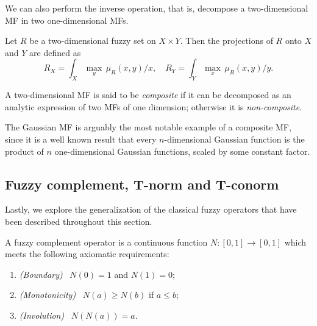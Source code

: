 We can also perform the inverse operation, that is, decompose a two-dimensional MF in two one-dimensional MFs.

\begin{definition}[Projections] Let $R$ be a two-dimensional fuzzy set on $X\times Y$. Then the projections of $R$ onto $X$ and $Y$ are defined as
\[
R_X = \int_X \max_y \, \mu_R(x,y) \slash x, \quad R_Y = \int_Y \max_x \, \mu_R(x,y) \slash y.
\]

\end{definition}

\begin{definition}[Composite MF] A two-dimensional MF is said to be \textit{composite} if it can be decomposed as an analytic expression of two MFs of one dimension; otherwise it is \textit{non-composite}.

\end{definition}

The Gaussian MF is arguably the most notable example of a composite MF, since it is a well known result that every $n$-dimensional Gaussian function is the product of $n$ one-dimensional Gaussian functions, scaled by some constant factor.



\subsection{Fuzzy complement, T-norm and T-conorm} \label{ssec:tnorm}

Lastly, we explore the generalization of the classical fuzzy operators that have been described throughout this section.

\begin{definition} A fuzzy complement operator is a continuous function $N:[0,1] \to [0,1]$ which meets the following axiomatic requirements:

\begin{enumerate}
	\item \textit{(Boundary)} \ $N(0)=1$ and $N(1)=0$;
	\item \textit{(Monotonicity)} \ $N(a) \ge N(b)$ if $a \le b$;
	\item \textit{(Involution)} \ $N(N(a)) = a$.
\end{enumerate}

\end{definition}

